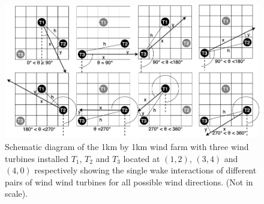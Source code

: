 	\begin{figure}[H]
        \centering
        \includegraphics[width=\textwidth]{Figures/123440.png}
        \caption{Schematic diagram of the 1km by 1km wind farm with three wind turbines installed $T_1$, $T_2$ and $T_3$ located at $(1,2)$, $(3,4)$ and $(4,0)$ respectively showing the single wake interactions of different pairs of wind wind turbines for all possible wind directions. (Not in scale).}
        \label{123440}
    \end{figure}


